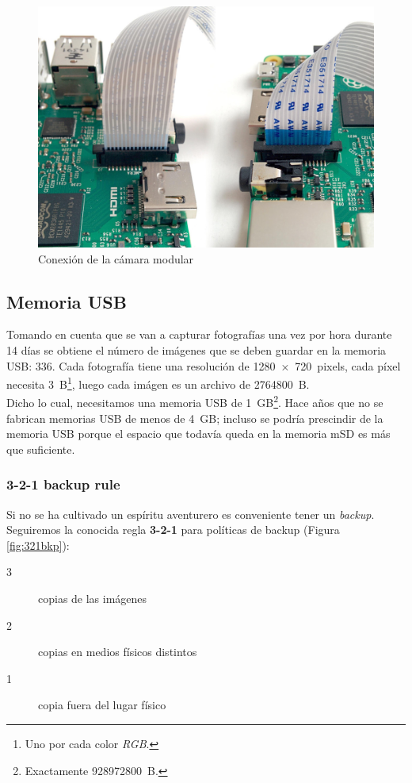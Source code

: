 \documentclass[10pt,a4paper]{article}
\begin{document}
\begin{figure}
\centering
    \includegraphics[scale=0.15]{connect-camera.jpg}
    \caption{Conexi\'on de la c\'amara modular}
    \label{fig:ribbon}
\end{figure}

\subsection{Memoria USB}

Tomando en cuenta que se van a capturar fotograf\'ias una vez por hora durante 14 d\'ias se obtiene el n\'umero de im\'agenes que se deben guardar en la memoria USB: $336$. Cada fotograf\'ia tiene una resoluci\'on de \SI{1280x720}{pixels}, cada p\'ixel necesita \SI{3}{B}\footnote{Uno por cada color \emph{RGB}.}, luego cada im\'agen es un archivo de \SI{2764800}{B}.\\

Dicho lo cual, necesitamos una memoria USB de \SI{1}{GB}\footnote{Exactamente \SI{928972800}{B}.}. Hace a\~nos que no se fabrican memorias USB de menos de \SI{4}{GB}; incluso se podr\'ia prescindir de la memoria USB porque el espacio que todav\'ia queda en la memoria mSD es m\'as que suficiente.\\

\subsubsection{3-2-1 backup rule}

Si no se ha cultivado un esp\'iritu aventurero es conveniente tener un \emph{backup}. Seguiremos la conocida regla \textbf{3-2-1} para pol\'iticas de backup (Figura \ref{fig:321bkp}):
\begin{description}
    \item [3] copias de las im\'agenes
    \item [2] copias en medios f\'isicos distintos
    \item [1] copia fuera del lugar f\'isico
\end{description}
\end{document}
